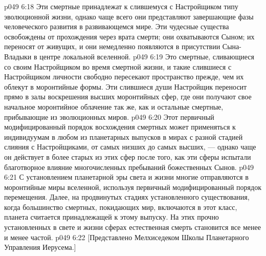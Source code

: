 \vs p049 6:18 \bibnobreakspace {} Эти смертные принадлежат к слившемуся с Настройщиком типу эволюционной жизни, однако чаще всего они представляют завершающие фазы человеческого развития в развивающемся мире. Эти чудесные существа освобождены от прохождения через врата смерти; они охватываются Сыном; их переносят от живущих, и они немедленно появляются в присутствии Сына\hyp{}Владыки в центре локальной вселенной.
\vs p049 6:19 Это смертные, сливающиеся со своим Настройщиком во время смертной жизни, и такие слившиеся с Настройщиком личности свободно пересекают пространство прежде, чем их облекут в моронтийные формы. Эти слившиеся души Настройщик переносит прямо в залы воскрешения высших моронтийных сфер, где они получают свое начальное моронтийное облачение так же, как и остальные смертные, прибывающие из эволюционных миров.
\vs p049 6:20 Этот первичный модифицированный порядок восхождения смертных может применяться к индивидуумам в любом из планетарных выпусков в мирах с разной стадией слияния с Настройщиками, от самых низших до самых высших, --- однако чаще он действует в более старых из этих сфер после того, как эти сферы испытали благотворное влияние многочисленных пребываний божественных Сынов.
\vs p049 6:21 С установлением планетарной эры света и жизни многие отправляются в моронтийные миры вселенной, используя первичный модифицированный порядок перемещения. Далее, на продвинутых стадиях установленного существования, когда большинство смертных, покидающих мир, включаются в этот класс, планета считается принадлежащей к этому выпуску. На этих прочно установленных в свете и жизни сферах естественная смерть становится все менее и менее частой.
\vsetoff
\vs p049 6:22 [Представлено Мелхиседеком Школы Планетарного Управления Иерусема.]
